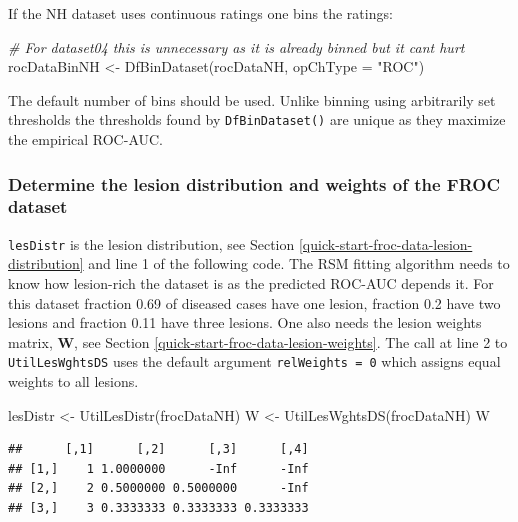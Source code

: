 \documentclass[
]{book}
\newenvironment{Shaded}{\begin{snugshade}}{\end{snugshade}}
\newcommand{\AttributeTok}[1]{\textcolor[rgb]{0.77,0.63,0.00}{#1}}
\newcommand{\CommentTok}[1]{\textcolor[rgb]{0.56,0.35,0.01}{\textit{#1}}}
\newcommand{\FunctionTok}[1]{\textcolor[rgb]{0.00,0.00,0.00}{#1}}
\newcommand{\NormalTok}[1]{#1}
\newcommand{\OtherTok}[1]{\textcolor[rgb]{0.56,0.35,0.01}{#1}}
\newcommand{\StringTok}[1]{\textcolor[rgb]{0.31,0.60,0.02}{#1}}
\begin{document}
If the NH dataset uses continuous ratings one bins the ratings:

\begin{Shaded}
\begin{Highlighting}[]
\CommentTok{\# For dataset04 this is unnecessary as it is already binned but it can\textquotesingle{}t hurt}
\NormalTok{rocDataBinNH }\OtherTok{\textless{}{-}} \FunctionTok{DfBinDataset}\NormalTok{(rocDataNH, }\AttributeTok{opChType =} \StringTok{"ROC"}\NormalTok{)}
\end{Highlighting}
\end{Shaded}

The default number of bins should be used. Unlike binning using arbitrarily set thresholds the thresholds found by \texttt{DfBinDataset()} are unique as they maximize the empirical ROC-AUC.

\hypertarget{determine-the-lesion-distribution-and-weights-of-the-froc-dataset}{%
\subsubsection{Determine the lesion distribution and weights of the FROC dataset}\label{determine-the-lesion-distribution-and-weights-of-the-froc-dataset}}

\texttt{lesDistr} is the lesion distribution, see Section \ref{quick-start-froc-data-lesion-distribution} and line 1 of the following code. The RSM fitting algorithm needs to know how lesion-rich the dataset is as the predicted ROC-AUC depends it. For this dataset fraction 0.69 of diseased cases have one lesion, fraction 0.2 have two lesions and fraction 0.11 have three lesions. One also needs the lesion weights matrix, \(\textbf{W}\), see Section \ref{quick-start-froc-data-lesion-weights}. The call at line 2 to \texttt{UtilLesWghtsDS} uses the default argument \texttt{relWeights\ =\ 0} which assigns equal weights to all lesions.

\begin{Shaded}
\begin{Highlighting}[numbers=left,,]
\NormalTok{lesDistr }\OtherTok{\textless{}{-}} \FunctionTok{UtilLesDistr}\NormalTok{(frocDataNH)}
\NormalTok{W }\OtherTok{\textless{}{-}} \FunctionTok{UtilLesWghtsDS}\NormalTok{(frocDataNH)}
\NormalTok{W}
\end{Highlighting}
\end{Shaded}

\begin{verbatim}
##      [,1]      [,2]      [,3]      [,4]
## [1,]    1 1.0000000      -Inf      -Inf
## [2,]    2 0.5000000 0.5000000      -Inf
## [3,]    3 0.3333333 0.3333333 0.3333333
\end{verbatim}
\end{document}
